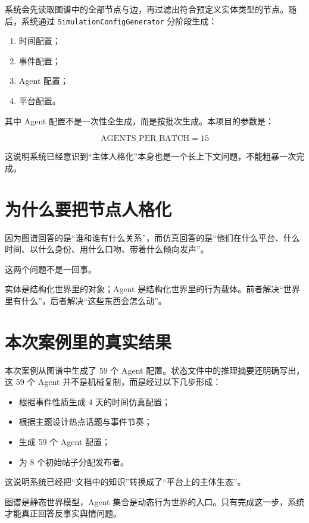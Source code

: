 \documentclass[UTF8,10pt,oneside]{ctexbook}
\newcommand{\code}[1]{\nolinkurl{#1}}
\begin{document}
系统会先读取图谱中的全部节点与边，再过滤出符合预定义实体类型的节点。随后，系统通过
\code{SimulationConfigGenerator} 分阶段生成：

\begin{enumerate}
  \item 时间配置；
  \item 事件配置；
  \item Agent 配置；
  \item 平台配置。
\end{enumerate}

其中 Agent 配置不是一次性全生成，而是按批次生成。本项目的参数是：

\[
\text{AGENTS\_PER\_BATCH} = 15
\]

这说明系统已经意识到“主体人格化”本身也是一个长上下文问题，不能粗暴一次完成。

\section{为什么要把节点人格化}

因为图谱回答的是“谁和谁有什么关系”，而仿真回答的是“他们在什么平台、什么时间、以什么身份、用什么口吻、带着什么倾向发声”。

这两个问题不是一回事。

\begin{definitionbox}
实体是结构化世界里的对象；Agent 是结构化世界里的行为载体。前者解决“世界里有什么”，后者解决“这些东西会怎么动”。
\end{definitionbox}

\section{本次案例里的真实结果}

本次案例从图谱中生成了 59 个 Agent 配置。状态文件中的推理摘要还明确写出，这 59 个 Agent 并不是机械复制，而是经过以下几步形成：

\begin{itemize}
  \item 根据事件性质生成 4 天的时间仿真配置；
  \item 根据主题设计热点话题与事件节奏；
  \item 生成 59 个 Agent 配置；
  \item 为 8 个初始帖子分配发布者。
\end{itemize}

这说明系统已经把“文档中的知识”转换成了“平台上的主体生态”。

\begin{takeawaybox}[本章核心结论]
图谱是静态世界模型，Agent 集合是动态行为世界的入口。只有完成这一步，系统才能真正回答反事实舆情问题。
\end{takeawaybox}
\end{document}

